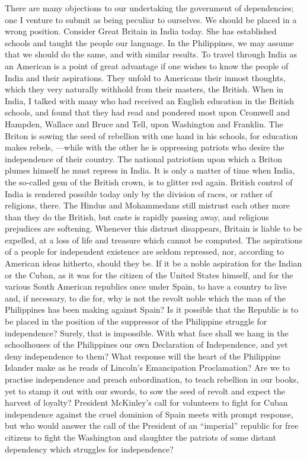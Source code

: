 \documentclass[11pt,openany]{book}
\begin{document}
There are many objections to our undertaking the government of dependencies; one I venture to submit as being peculiar to ourselves. We should be placed in a wrong position. Consider Great Britain in India today. She has established schools and taught the people our language. In the Philippines, we may assume that we should do the same, and with similar results. To travel through India as an American is a point of great advantage if one wishes to know the people of India and their aspirations. They unfold to Americans their inmost thoughts, which they very naturally withhold from their masters, the British. When in India, I talked with many who had received an English education in the British schools, and found that they had read and pondered most upon Cromwell and Hampden, Wallace and Bruce and Tell, upon Washington and Franklin. The Briton is sowing the seed of rebellion with one hand in his schools, for education makes rebels, ---while with the other he is oppressing patriots who desire the independence of their country. The national patriotism upon which a Briton plumes himself he must repress in India. It is only a matter of time when India, the so-called gem of the British crown, is to glitter red again. British control of India is rendered possible today only by the division of races, or rather of religions, there. The Hindus and Mohammedans still mistrust each other more than they do the British, but caste is rapidly passing away, and religious prejudices are softening. Whenever this distrust disappears, Britain is liable to be expelled, at a loss of life and treasure which cannot be computed. The aspirations of a people for independent existence are seldom repressed, nor, according to American ideas hitherto, should they be. If it be a noble aspiration for the Indian or the Cuban, as it was for the citizen of the United States himself, and for the various South American republics once under Spain, to have a country to live and, if necessary, to die for, why is not the revolt noble which the man of the Philippines has been making against Spain? Is it possible that the Republic is to be placed in the position of the suppressor of the Philippine struggle for independence? Surely, that is impossible. With what face shall we hang in the schoolhouses of the Philippines our own Declaration of Independence, and yet deny independence to them? What response will the heart of the Philippine Islander make as he reads of Lincoln's Emancipation Proclamation? Are we to practise independence and preach subordination, to teach rebellion in our books, yet to stamp it out with our swords, to sow the seed of revolt and expect the harvest of loyalty? President McKinley's call for volunteers to fight for Cuban independence against the cruel dominion of Spain meets with prompt response, but who would answer the call of the President of an ``imperial'' republic for free citizens to fight the Washington and slaughter the patriots of some distant dependency which struggles for independence?
\end{document}
